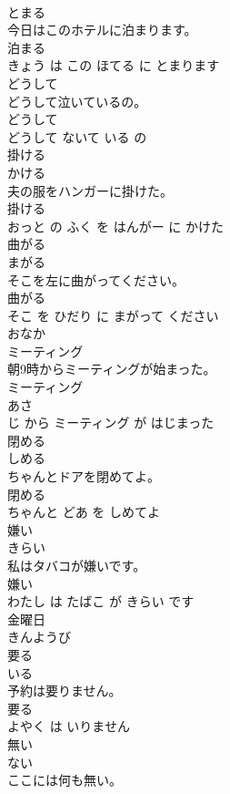 \documentclass[8pt]{extreport}
\begin{document}
\begin{CJK}{UTF8}{min}
\\	とまる			
\\	今日はこのホテルに泊まります。	
\\	泊まる 
\\	きょう は この ほてる に とまります			
\\	どうして	
\\	どうして泣いているの。	
\\	どうして 
\\	どうして ないて いる の			
\\	掛ける	
\\	かける			
\\	夫の服をハンガーに掛けた。	
\\	掛ける 
\\	おっと の ふく を はんがー に かけた			
\\	曲がる	
\\	まがる			
\\	そこを左に曲がってください。	
\\	曲がる 
\\	そこ を ひだり に まがって ください			
\\	おなか	
\\	ミーティング	
\\	朝9時からミーティングが始まった。	
\\	ミーティング 
\\	あさ 
\\	じ から ミーティング が はじまった			
\\	閉める	
\\	しめる			
\\	ちゃんとドアを閉めてよ。	
\\	閉める 
\\	ちゃんと どあ を しめてよ			
\\	嫌い	
\\	きらい			
\\	私はタバコが嫌いです。	
\\	嫌い 
\\	わたし は たばこ が きらい です			
\\	金曜日	
\\	きんようび			
\\	要る	
\\	いる			
\\	予約は要りません。	
\\	要る 
\\	よやく は いりません			
\\	無い	
\\	ない			
\\	ここには何も無い。	

\end{CJK}
\end{document}
